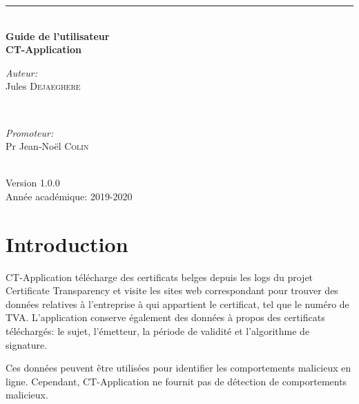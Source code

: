\documentclass{article}
\begin{document}
\begin{titlepage}

\newcommand{\HRule}{\rule{\linewidth}{0.5mm}} 

\center 

\HRule \\[0.4cm]
{\huge \bfseries Guide de l'utilisateur\\[0.4cm] CT-Application}\\[0.4cm] 


\begin{minipage}{0.4\textwidth}
\begin{flushleft} \large
\emph{Auteur:}\\
Jules \textsc{Dejaeghere} 
\end{flushleft}
\end{minipage}
~
\begin{minipage}{0.4\textwidth}
\begin{flushright} \large
\emph{Promoteur:} \\
Pr Jean-Noël \textsc{Colin} 
\end{flushright}
\end{minipage}\\[2cm]


{\large 
Version 1.0.0\\
\medskip
Année académique: 2019-2020}\\[2cm] 

 

\vfill

\end{titlepage}


\tableofcontents

\newpage

\section{Introduction}

CT-Application télécharge des certificats belges depuis les logs du projet Certificate Transparency et visite les sites web correspondant pour trouver des données relatives à l'entreprise à qui appartient le certificat, tel que le numéro de TVA.  L'application conserve également des données à propos des certificats téléchargés: le sujet, l'émetteur, la période de validité et l'algorithme de signature.

Ces données peuvent être utilisées pour identifier les comportements malicieux en ligne.  Cependant, CT-Application ne fournit pas de détection de comportements malicieux.
\end{document}

